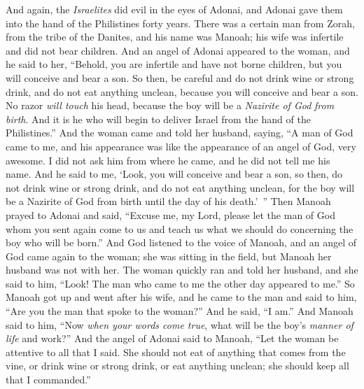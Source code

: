 \begin{biblechapter} %
 And again, the \textit{Israelites} did evil in the eyes of Adonai, and Adonai gave them into the hand of the Philistines forty years.
\verse There was a certain man from Zorah, from the tribe of the Danites, and his name was Manoah; his wife was infertile and did not bear children.
\verse And an angel of Adonai appeared to the woman, and he said to her, “Behold, you are infertile and have not borne children, but you will conceive and bear a son.
\verse So then, be careful and do not drink wine or strong drink, and do not eat anything unclean,
\verse because you will conceive and bear a son. No razor \textit{will touch} his head, because the boy will be a \textit{Nazirite of God} \textit{from birth}. And it is he who will begin to deliver Israel from the hand of the Philistines.”
\verse And the woman came and told her husband, saying, “A man of God came to me, and his appearance was like the appearance of an angel of God, very awesome. I did not ask him from where he came, and he did not tell me his name.
\verse And he said to me, ‘Look, you will conceive and bear a son, so then, do not drink wine or strong drink, and do not eat anything unclean, for the boy will be a Nazirite of God from birth until the day of his death.’ ”
\verse Then Manoah prayed to Adonai and said, “Excuse me, my Lord, please let the man of God whom you sent again come to us and teach us what we should do concerning the boy who will be born.”
\verse And God listened to the voice of Manoah, and an angel of God came again to the woman; she was sitting in the field, but Manoah her husband was not with her.
\verse The woman quickly ran and told her husband, and she said to him, “Look! The man who came to me the other day appeared to me.”
\verse So Manoah got up and went after his wife, and he came to the man and said to him, “Are you the man that spoke to the woman?” And he said, “I am.”
\verse And Manoah said to him, “Now \textit{when your words come true}, what will be the boy’s \textit{manner of life} and work?”
\verse And the angel of Adonai said to Manoah, “Let the woman be attentive to all that I said.
\verse She should not eat of anything that comes from the vine, or drink wine or strong drink, or eat anything unclean; she should keep all that I commanded.”

\end{biblechapter}
